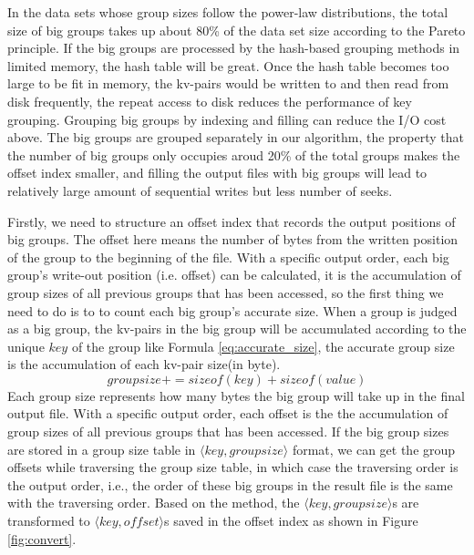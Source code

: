 In the data sets whose group sizes follow the power-law distributions, the total size of big groups takes up about 80\% of the data set size according to the Pareto principle. If the big groups are processed by the hash-based grouping methods in limited memory, the hash table will be great. Once the hash table becomes too large to be fit in memory, the kv-pairs would be written to and then read from disk frequently, the repeat access to disk reduces the performance of key grouping. Grouping big groups by indexing and filling can reduce the I/O cost above. The big groups are grouped separately in our algorithm, the property that the number of big groups only occupies aroud 20\% of the total groups makes the offset index smaller, and filling the output files with big groups will lead to relatively large amount of sequential writes but less number of seeks. 

Firstly, we need to structure an offset index that records the output positions of big groups. The offset here means the number of bytes from the written position of the group to the beginning of the file. With a specific output order, each big group's write-out position (i.e. offset) can be calculated, it is the accumulation of group sizes of all previous groups that has been accessed, so the first thing we need to do is to to count each big group's accurate size. When a group is judged as a big group, the kv-pairs in the big group will be accumulated according to the unique $key$ of the group like Formula \ref{eq:accurate_size}, the accurate group size is the accumulation of each kv-pair size(in byte).
\begin{equation}\label{eq:accurate_size}
    groupsize += sizeof(key) + sizeof(value)
\end{equation}
Each group size represents how many bytes the big group will take up in the final output file. With a specific output order, each offset is the
the accumulation of group sizes of all previous groups that has been accessed. If the big group sizes are stored in a group size table in $\langle key, groupsize\rangle$ format, we can get the group offsets while traversing the group size table, in which case the traversing order is the output order, i.e., the order of these big groups in the result file is the same with the traversing order. Based on the method, the $\langle key, groupsize\rangle$s are transformed to $\langle key, offset\rangle$s saved in the offset index as shown in Figure \ref{fig:convert}.

